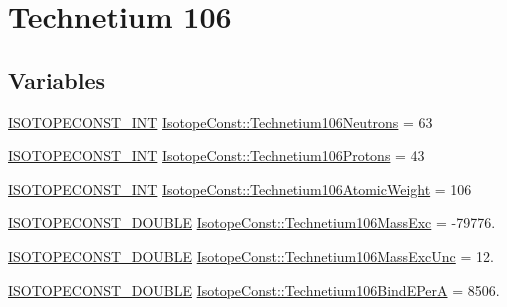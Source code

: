 \hypertarget{group___isotope_const-_technetium-_tc106}{}\section{Technetium 106}
\label{group___isotope_const-_technetium-_tc106}
\subsection*{Variables}
\begin{DoxyCompactItemize}
\item 
\mbox{\hyperlink{group___isotope_const-_macros_ga5f18360b3e99483a35c32d789e62621c}{I\+S\+O\+T\+O\+P\+E\+C\+O\+N\+S\+T\+\_\+\+I\+NT}} \mbox{\hyperlink{group___isotope_const-_technetium-_tc106_ga2285206288e545e641bd182f165388d7}{Isotope\+Const\+::\+Technetium106\+Neutrons}} = 63
\item 
\mbox{\hyperlink{group___isotope_const-_macros_ga5f18360b3e99483a35c32d789e62621c}{I\+S\+O\+T\+O\+P\+E\+C\+O\+N\+S\+T\+\_\+\+I\+NT}} \mbox{\hyperlink{group___isotope_const-_technetium-_tc106_gacbabcc4b3b0c4945b63b686dc7c48149}{Isotope\+Const\+::\+Technetium106\+Protons}} = 43
\item 
\mbox{\hyperlink{group___isotope_const-_macros_ga5f18360b3e99483a35c32d789e62621c}{I\+S\+O\+T\+O\+P\+E\+C\+O\+N\+S\+T\+\_\+\+I\+NT}} \mbox{\hyperlink{group___isotope_const-_technetium-_tc106_ga491f0b03430890bb63e014913d130ab5}{Isotope\+Const\+::\+Technetium106\+Atomic\+Weight}} = 106
\item 
\mbox{\hyperlink{group___isotope_const-_macros_ga8f45a7272ce02c0b4c65c44636ed719a}{I\+S\+O\+T\+O\+P\+E\+C\+O\+N\+S\+T\+\_\+\+D\+O\+U\+B\+LE}} \mbox{\hyperlink{group___isotope_const-_technetium-_tc106_gacf5f7aa841925a4c85ab3ca76bd39442}{Isotope\+Const\+::\+Technetium106\+Mass\+Exc}} = -\/79776.
\item 
\mbox{\hyperlink{group___isotope_const-_macros_ga8f45a7272ce02c0b4c65c44636ed719a}{I\+S\+O\+T\+O\+P\+E\+C\+O\+N\+S\+T\+\_\+\+D\+O\+U\+B\+LE}} \mbox{\hyperlink{group___isotope_const-_technetium-_tc106_gaa8cc4f359a990bb13a6eba69990a8b90}{Isotope\+Const\+::\+Technetium106\+Mass\+Exc\+Unc}} = 12.
\item 
\mbox{\hyperlink{group___isotope_const-_macros_ga8f45a7272ce02c0b4c65c44636ed719a}{I\+S\+O\+T\+O\+P\+E\+C\+O\+N\+S\+T\+\_\+\+D\+O\+U\+B\+LE}} \mbox{\hyperlink{group___isotope_const-_technetium-_tc106_ga65ed29bc4ab120a5bd8272e30be0c1cb}{Isotope\+Const\+::\+Technetium106\+Bind\+E\+PerA}} = 8506.

\end{DoxyCompactItemize}

